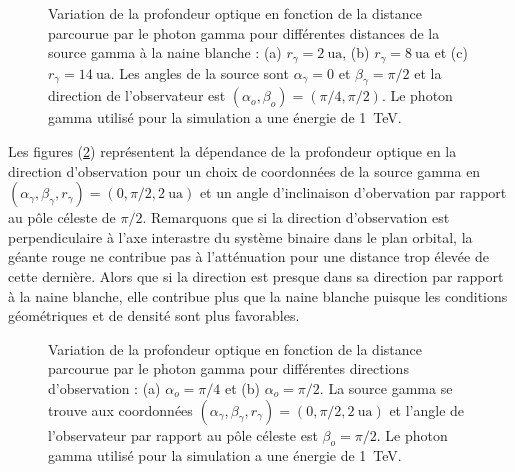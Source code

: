 \documentclass[a4paper,12pt,twoside]{article}
\begin{document}
\begin{figure}
	\centering
    \hfill
    \hfill
    \hfill
    \caption{Variation de la profondeur optique en fonction de la distance parcourue par le photon gamma pour différentes distances de la source gamma à la naine blanche : (a) $r_\gamma = \SI{2}{\astronomicalunit}$, (b) $r_\gamma = \SI{8}{\astronomicalunit}$ et (c) $r_\gamma = \SI{14}{\astronomicalunit}$. Les angles de la source sont $\alpha_\gamma = 0$ et $\beta_\gamma = \pi/2$ et la direction de l'observateur est $(\alpha_o, \beta_o) = (\pi/4, \pi/2)$. Le photon gamma utilisé pour la simulation a une énergie de \SI{1}{\TeV}.}
    \label{fig: tau r_gamma}
\end{figure}

Les figures (\ref{fig: tau alpha_o}) représentent la dépendance de la profondeur optique en la direction d'observation pour un choix de coordonnées de la source gamma en $(\alpha_\gamma, \beta_\gamma, r_\gamma) = (0, \pi/2, \SI{2}{\astronomicalunit})$ et un angle d'inclinaison d'obervation par rapport au pôle céleste de $\pi/2$. Remarquons que si la direction d'observation est perpendiculaire à l'axe interastre du système binaire dans le plan orbital, la géante rouge ne contribue pas à l'atténuation pour une distance trop élevée de cette dernière. Alors que si la direction est presque dans sa direction par rapport à la naine blanche, elle contribue plus que la naine blanche puisque les conditions géométriques et de densité sont plus favorables.

\begin{figure}
	\centering
    \hfill
    \hfill
    \caption{Variation de la profondeur optique en fonction de la distance parcourue par le photon gamma pour différentes directions d'observation : (a) $\alpha_o = \pi/4$ et (b) $\alpha_o = \pi/2$. La source gamma se trouve aux coordonnées $(\alpha_\gamma, \beta_\gamma, r_\gamma) = (0, \pi/2, \SI{2}{\astronomicalunit})$ et l'angle de l'observateur par rapport au pôle céleste est $\beta_o = \pi/2$. Le photon gamma utilisé pour la simulation a une énergie de \SI{1}{\TeV}.}
    \label{fig: tau alpha_o}
\end{figure}
\end{document}
